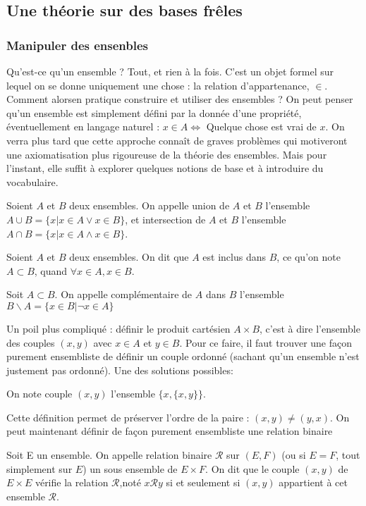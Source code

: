 \subsection{Une théorie sur des bases frêles}
\subsubsection{Manipuler des ensenbles}
Qu'est-ce qu'un ensemble ? Tout, et rien à la fois. C'est un objet formel sur lequel on se donne uniquement une chose : la relation d'appartenance, $\in$.
Comment alorsen pratique construire et utiliser des ensembles ? On peut penser qu'un ensemble est simplement défini par la donnée d'une propriété, éventuellement en langage naturel : $x\in A \iff$ Quelque chose est vrai de $x$. On verra plus tard que cette approche connaît de graves problèmes qui motiveront une axiomatisation plus rigoureuse de la théorie des ensembles. Mais pour l'instant, elle suffit à explorer quelques notions de base et à introduire du vocabulaire.
\begin{defini}
	Soient $A$ et $B$ deux ensembles. On appelle union de $A$ et $B$ l'ensemble $A \cup B=\{x|x\in A \lor x \in B\}$, et intersection de $A$ et $B$ l'ensemble $A\cap B=\{x|x\in A \land x\in B\}$. 
\end{defini}
\begin{defini}
	Soient $A$ et $B$ deux ensembles. On dit que $A$ est inclus dans $B$, ce qu'on note $A\subset B$, quand $\forall x \in A, x\in B$.
\end{defini}
\begin{defini}
	Soit $A\subset B$. On appelle complémentaire de $A$ dans $B$ l'ensemble $B\backslash A = \{x\in B | \lnot x\in A\}$
\end{defini}
Un poil plus compliqué : définir le produit cartésien $A\times B$, c'est à dire l'ensemble des couples $(x,y)$ avec $x\in A$ et $y\in B$. Pour ce faire, il faut trouver une façon purement ensembliste de définir un couple ordonné (sachant qu'un ensemble n'est justement pas ordonné). Une des solutions possibles:
\begin{defini}
	On note couple $(x,y)$ l'ensemble $\{x, \{x,y\}\}$.
\end{defini}
Cette définition permet de préserver l'ordre de la paire : $(x,y)\neq (y,x)$.
On peut maintenant définir de façon purement ensembliste une relation binaire
\begin{defini}
	Soit E un ensemble. On appelle relation binaire $\mathcal{R}$ sur $(E, F)$ (ou si $E=F$, tout simplement sur $E$) un sous ensemble de $E\times F$. On dit que le couple $(x,y)$ de $E\times E$ vérifie la relation $\mathcal{R}$,noté $x\mathcal{R}y$ si et seulement si $(x,y)$ appartient à cet ensemble $\mathcal{R}$.
\end{defini}
	

